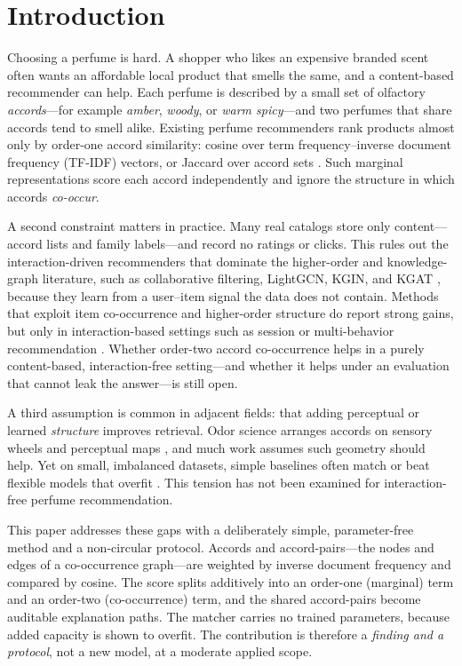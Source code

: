 \documentclass[conference]{IEEEtran}
\begin{document}
\section{Introduction}
Choosing a perfume is hard. A shopper who likes an expensive branded scent often wants an
affordable local product that smells the same, and a content-based recommender can help.
Each perfume is described by a small set of olfactory \emph{accords}---for example
\textit{amber}, \textit{woody}, or \textit{warm spicy}---and two perfumes that share
accords tend to smell alike. Existing perfume recommenders rank products almost only by
order-one accord similarity: cosine over term frequency--inverse document frequency
(TF-IDF) vectors, or Jaccard over accord sets \cite{r23,r24,r28}. Such marginal
representations score each accord independently and ignore the structure in which accords
\emph{co-occur}.

A second constraint matters in practice. Many real catalogs store only content---accord
lists and family labels---and record no ratings or clicks. This rules out the
interaction-driven recommenders that dominate the higher-order and knowledge-graph
literature, such as collaborative filtering, LightGCN, KGIN, and KGAT \cite{r20}, because
they learn from a user--item signal the data does not contain. Methods that exploit item
co-occurrence and higher-order structure do report strong gains, but only in
interaction-based settings such as session or multi-behavior recommendation
\cite{r1,r2,r3,r4,r5}. Whether order-two accord co-occurrence helps in a purely
content-based, interaction-free setting---and whether it helps under an evaluation that
cannot leak the answer---is still open.

A third assumption is common in adjacent fields: that adding perceptual or learned
\emph{structure} improves retrieval. Odor science arranges accords on sensory wheels and
perceptual maps \cite{r10,r12,r13}, and much work assumes such geometry should help. Yet on
small, imbalanced datasets, simple baselines often match or beat flexible models that
overfit \cite{r14,r15,r16,r17}. This tension has not been examined for interaction-free
perfume recommendation.

This paper addresses these gaps with a deliberately simple, parameter-free method and a
non-circular protocol. Accords and accord-pairs---the nodes and edges of a co-occurrence
graph---are weighted by inverse document frequency and compared by cosine. The score splits
additively into an order-one (marginal) term and an order-two (co-occurrence) term, and the
shared accord-pairs become auditable explanation paths. The matcher carries no trained
parameters, because added capacity is shown to overfit. The contribution is therefore a
\emph{finding and a protocol}, not a new model, at a moderate applied scope.
\end{document}
